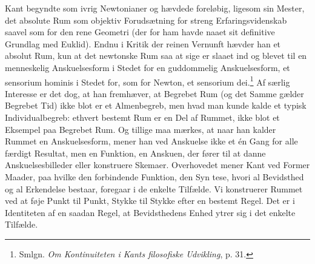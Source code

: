 \documentclass[12pt]{article}
\newcommand{\opage}[1]{\marginnote{\footnotesize\textit{[#1]}}}
\begin{document}
Kant begyndte som ivrig Newtonianer og hævdede foreløbig, ligesom sin Mester,
det absolute Rum som objektiv Forudsætning for streng Erfaringsvidenskab
saavel som for den rene Geometri (der for ham havde naaet sit definitive
Grundlag med Euklid). Endnu i \guillemotright Kritik der reinen
Vernunft\guillemotleft{} hævder han et absolut Rum, kun at det newtonske Rum
saa at sige er \guillemotright slaaet ind\guillemotleft{} og blevet til en
menneskelig Anskuelsesform i Stedet for en guddommelig Anskuelsesform, et
sensorium hominis i Stedet for, som for Newton, et sensorium
dei.\footnote{Smlgn. \textit{Om Kontinuiteten i Kants filosofiske Udvikling},
p. 31.} Af særlig Interesse er det dog, at han fremhæver, at Begrebet Rum (og
det Samme gælder Begrebet Tid) ikke blot er et Almenbegreb, men hvad man kunde
kalde et typisk Individualbegreb: ethvert bestemt Rum er en Del af Rummet,
ikke blot et Eksempel paa Begrebet Rum. Og tillige maa mærkes, at naar han
kalder Rummet en Anskuelsesform, mener han ved Anskuelse ikke et én Gang for
alle færdigt Resultat, men en Funktion, en Anskuen, der fører til at danne
Anskuelsesbilleder eller konstruere Skemaer. Overhovedet mener Kant ved
\guillemotright Former\guillemotleft{} Maader, paa hvilke den forbindende
Funktion, den Syn%
\opage{70}tese, hvori al Bevidsthed og al Erkendelse bestaar, foregaar i de enkelte
Tilfælde. Vi konstruerer Rummet ved at føje Punkt til Punkt, Stykke til Stykke
efter en bestemt Regel. Det er i Identiteten af en saadan Regel, at
Bevidsthedens Enhed ytrer sig i det enkelte Tilfælde.
\end{document}

